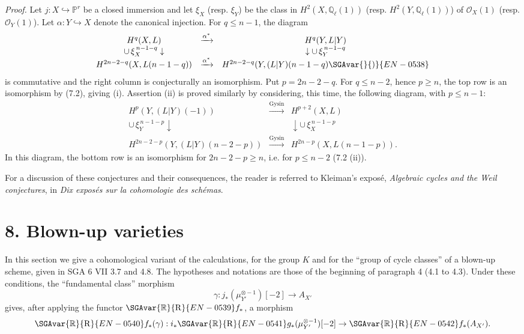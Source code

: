 \emph{Proof.} Let $j:X\hookrightarrow\mathbb P^r$ be a closed immersion and let $\xi_X$ (resp. $\xi_Y$) be the class in $H^2(X,\mathbb Q_\ell(1))$ (resp. $H^2(Y,\mathbb Q_\ell(1))$) of $\mathcal O_X(1)$ (resp. $\mathcal O_Y(1)$). Let $\alpha:Y\hookrightarrow X$ denote the canonical injection. For $q\le n-1$, the diagram
\[
\begin{array}{ccc}
H^q(X,L)&\xrightarrow{\alpha^*}&H^q(Y,L|Y)\\
\cup\,\xi_X^{\,n-1-q}\downarrow&&\downarrow\cup\,\xi_Y^{\,n-1-q}\\
H^{2n-2-q}(X,L(n-1-q))&\xrightarrow{\alpha^*}&
H^{2n-2-q}(Y,(L|Y)(n-1-q)\SGAvar{}{)}{EN-0538}
\end{array}
\]
is commutative and the right column is conjecturally an isomorphism. Put $p=2n-2-q$. For $q\le n-2$, hence $p\ge n$, the top row is an isomorphism by (7.2), giving (i). Assertion (ii) is proved similarly by considering, this time, the following diagram, with $p\le n-1$:
\[
\begin{array}{ccc}
H^p(Y,(L|Y)(-1))&\xrightarrow{\mathrm{Gysin}}&H^{p+2}(X,L)\\
\cup\,\xi_Y^{\,n-1-p}\downarrow&&\downarrow\cup\,\xi_X^{\,n-1-p}\\
H^{2n-2-p}(Y,(L|Y)(n-2-p))&\xrightarrow{\mathrm{Gysin}}&
H^{2n-p}(X,L(n-1-p)).
\end{array}
\]
In this diagram, the bottom row is an isomorphism for %
$2n-2-p\ge n$, i.e. for $p\le n-2$ (7.2 (ii)).

For a discussion of these conjectures and their consequences, the reader is referred to Kleiman's exposé, \emph{Algebraic cycles and the Weil conjectures}, in \emph{Dix exposés sur la cohomologie des schémas}.

\section*{8. Blown-up varieties}

In this section we give a cohomological variant of the calculations, for the group $K$ and for the ``group of cycle classes'' of a blown-up scheme, given in SGA 6 VII 3.7 and 4.8. The hypotheses and notations are those of the beginning of paragraph 4 (4.1 to 4.3). Under these conditions, the ``fundamental class'' morphism
\[
\gamma:j_*(\mu_{Y'}^{\otimes -1})[-2]\to A_{X'}
\]
gives, after applying the functor $\SGAvar{\mathbb{R}}{\mathrm{R}}{EN-0539}f_*$, a morphism
\[
\SGAvar{\mathbb{R}}{\mathrm{R}}{EN-0540}f_*(\gamma):i_*\SGAvar{\mathbb{R}}{\mathrm{R}}{EN-0541}g_*(\mu_{Y'}^{\otimes -1})[-2]\to \SGAvar{\mathbb{R}}{\mathrm{R}}{EN-0542}f_*(A_{X'}).
\]

